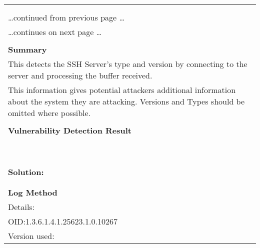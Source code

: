 \documentclass{article}
\begin{document}
\begin{longtable}{|p{}|}
\hline
\rowcolor{gvm_log}{\color{white}{Log (CVSS: 0.0) }}\\
\rowcolor{gvm_log}{\color{white}{NVT: SSH Server type and version}}\\
\hline
\endfirsthead
\hfill\ldots continued from previous page \ldots \\
\hline
\endhead
\hline
\ldots continues on next page \ldots \\
\endfoot
\hline
\endlastfoot
\\
\textbf{Summary}\\
This detects the SSH Server's type and version by connecting to the server
  and processing the buffer received.\\
  This information gives potential attackers additional information about the system they are attacking.
  Versions and Types should be omitted where possible.\\

        \hline
        \\
\textbf{Vulnerability Detection Result}\\
\rowcolor{white}{\verb=Remote SSH server banner: SSH-2.0-OpenSSH_8.2p1 Ubuntu-4ubuntu0.5=}\\
\rowcolor{white}{\verb=Remote SSH supported authentication: password,publickey=}\\
\rowcolor{white}{\verb=Remote SSH text/login banner: (not available)=}\\
\rowcolor{white}{\verb=This is probably:=}\\
\rowcolor{white}{\verb=- OpenSSH=}\\
\rowcolor{white}{\verb=Concluded from remote connection attempt with credentials:=}\\
\rowcolor{white}{\verb=Login:    OpenVASVT=}\\
\rowcolor{white}{\verb=Password: OpenVASVT=}\\

          \hline
          \\
\textbf{Solution:}\\
\\


        \hline
        \\
\textbf{Log Method}\\
Details:
\rowcolor{white}{\verb=SSH Server type and version=}\\
OID:1.3.6.1.4.1.25623.1.0.10267\\
Version used:
\rowcolor{white}{\verb=2021-09-28T06:32:28Z=}\\
\end{longtable}
\end{document}
